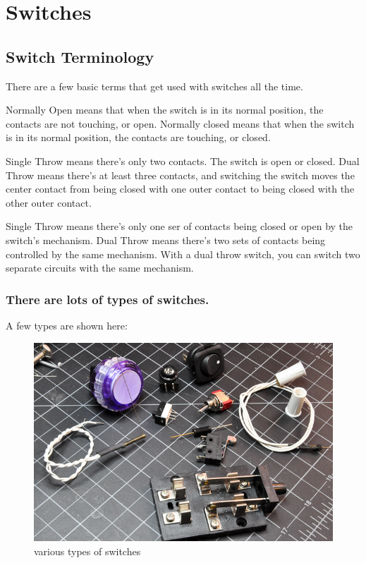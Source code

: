 \chapter{Switches}

\section{Switch Terminology}

There are a few basic terms that get used with switches all the time.

Normally Open means that when the switch is in its normal position, the contacts are not touching, or open. Normally closed means that when the switch is in its normal position, the contacts are touching, or closed.

Single Throw means there's only two contacts. The switch is open or closed. Dual Throw means there's at least three contacts, and switching the switch moves the center contact from being closed with one outer contact to being closed with the other outer contact.

Single Throw means there's only one ser of contacts being closed or open by the switch's mechanism. Dual Throw means there's two sets of contacts being controlled by the same mechanism. With a dual throw switch, you can switch two separate circuits with the same mechanism.

\subsection{There are lots of types of switches.}

A few types are shown here:

\begin{figure}[!htb]
 \centering
 \includegraphics[scale=0.3]{img/switches/switches.jpg}
 \caption{various types of switches}
 \label{various types of switches}
\end{figure}

